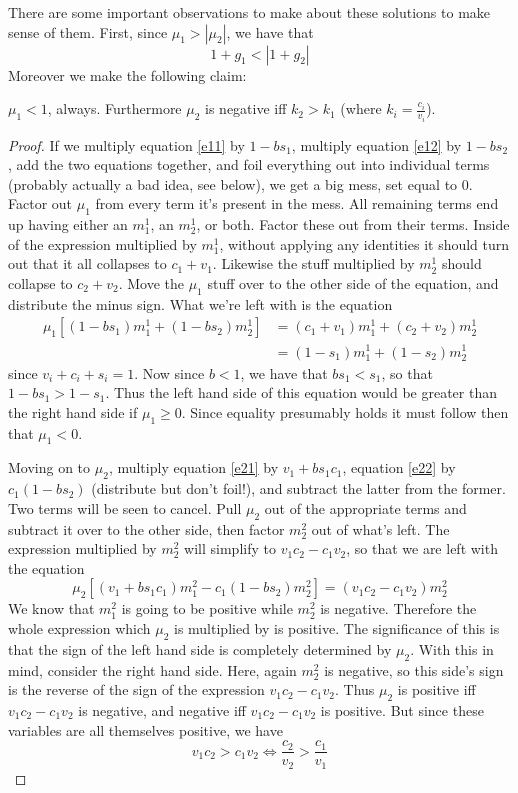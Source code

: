 There are some important observations to make about these solutions to make sense of them. First, since $\mu_1 > |\mu_2|$, we have that 
\[ 1+g_1 < |1+g_2| \]
Moreover we make the following claim:
\begin{lemma}
	$\mu_1 < 1$, always. Furthermore $\mu_2$ is negative iff $k_2 > k_1$ (where $k_i = \frac{c_i}{v_i}$). 
\end{lemma}
\begin{proof}
	If we multiply equation \ref{e11} by $1-bs_1$, multiply equation \ref{e12} by $1-bs_2$, add the two equations together, and foil everything out into individual terms (probably actually a bad idea, see below), we get a big mess, set equal to $0$. Factor out $\mu_1$ from every term it's present in the mess. All remaining terms end up having either an $m^1_1$, an $m^1_2$, or both. Factor these out from their terms. Inside of the expression multiplied by $m^1_1$, without applying any identities it should turn out that it all collapses to $c_1+v_1$. Likewise the stuff multiplied by $m^1_2$ should collapse to $c_2 + v_2$. Move the $\mu_1$ stuff over to the other side of the equation, and distribute the minus sign. What we're left with is the equation 
\begin{align}
	 \mu_1[(1-bs_1)m^1_1 + (1-bs_2)m^1_2] &= (c_1+v_1)m^1_1 + (c_2+v_2)m^1_2 \\
	 &= (1-s_1)m^1_1 + (1-s_2)m^1_2
\end{align}
since $v_i+c_i+s_i=1$. Now since $b<1$, we have that $bs_1 < s_1$, so that $1-bs_1 > 1-s_1$. Thus the left hand side of this equation would be greater than the right hand side if $\mu_1 \geq 0$. Since equality presumably holds it must follow then that $\mu_1 < 0$. \par 
Moving on to $\mu_2$, multiply equation \ref{e21} by $v_1 + bs_1c_1$, equation \ref{e22} by $c_1(1-bs_2)$ (distribute but don't foil!), and subtract the latter from the former. Two terms will be seen to cancel. Pull $\mu_2$ out of the appropriate terms and subtract it over to the other side, then factor $m^2_2$ out of what's left. The expression multiplied by $m^2_2$ will simplify to $v_1c_2 - c_1v_2$, so that we are left with the equation
\[ \mu_2[(v_1+bs_1c_1)m^2_1-c_1(1-bs_2)m^2_2] = (v_1c_2 - c_1v_2)m^2_2 \]
We know that $m^2_1$ is going to be positive while $m^2_2$ is negative. Therefore the whole expression which $\mu_2$ is multiplied by is positive. The significance of this is that the sign of the left hand side is completely determined by $\mu_2$. With this in mind, consider the right hand side. Here, again $m^2_2$ is negative, so this side's sign is the reverse of the sign of the expression $v_1c_2 - c_1v_2$. Thus $\mu_2$ is positive iff $v_1c_2 - c_1v_2$ is negative, and negative iff $v_1c_2 - c_1v_2$ is positive. But since these variables are all themselves positive, we have
\[ v_1c_2 > c_1v_2 \iff \frac{c_2}{v_2} > \frac{c_1}{v_1}  \]
\end{proof}
